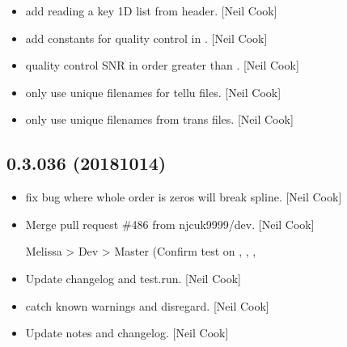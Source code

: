\documentclass[a4paper,10pt,english]{report}
\begin{document}
\begin{itemize}
\item {} 
 \sphinxhyphen{} add reading a key 1D list from header. {[}Neil Cook{]}

\item {} 
 \sphinxhyphen{} add constants for quality control in
. {[}Neil Cook{]}

\item {} 
 \sphinxhyphen{} quality control SNR in order 
greater than . {[}Neil Cook{]}

\item {} 
 \sphinxhyphen{} only use unique filenames for tellu files. {[}Neil
Cook{]}

\item {} 
 \sphinxhyphen{} only use unique filenames from trans files. {[}Neil
Cook{]}

\end{itemize}


\subsection{0.3.036 (2018\sphinxhyphen{}10\sphinxhyphen{}14)}
\label{\detokenize{misc/changelog:id315}}\begin{itemize}
\item {} 
  \sphinxhyphen{} fix bug where whole order is zeros \sphinxhyphen{} will break
spline. {[}Neil Cook{]}

\item {} 
Merge pull request \#486 from njcuk9999/dev. {[}Neil Cook{]}

Melissa \textendash{}\textgreater{} Dev \textendash{}\textgreater{} Master (Confirm test on , , , 

\item {} 
Update changelog and test.run. {[}Neil Cook{]}

\item {} 
 \sphinxhyphen{} catch known warnings and disregard. {[}Neil Cook{]}

\item {} 
Update notes and changelog. {[}Neil Cook{]}

\end{itemize}
\end{document}
